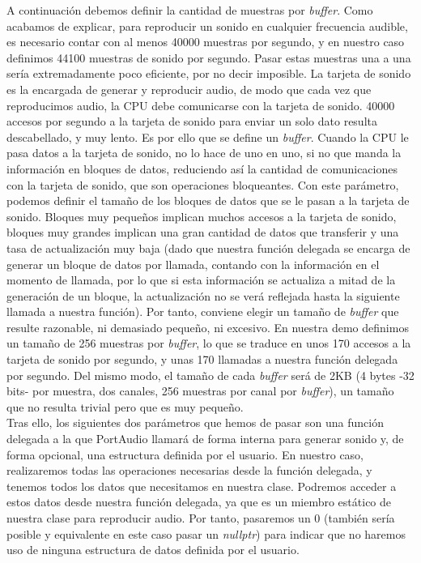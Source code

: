A continuación debemos definir la cantidad de muestras por \emph{buffer}. Como acabamos de explicar, para reproducir un sonido en cualquier frecuencia audible, es necesario contar con al menos 40000 muestras por segundo, y en nuestro caso definimos 44100 muestras de sonido por segundo. Pasar estas muestras una a una sería extremadamente poco eficiente, por no decir imposible. La tarjeta de sonido es la encargada de generar y reproducir audio, de modo que cada vez que reproducimos audio, la CPU debe comunicarse con la tarjeta de sonido. 40000 accesos por segundo a la tarjeta de sonido para enviar un solo dato resulta descabellado, y muy lento. Es por ello que se define un \emph{buffer}. Cuando la CPU le pasa datos a la tarjeta de sonido, no lo hace de uno en uno, si no que manda la información en bloques de datos, reduciendo así la cantidad de comunicaciones con la tarjeta de sonido, que son operaciones bloqueantes. Con este parámetro, podemos definir el tamaño de los bloques de datos que se le pasan a la tarjeta de sonido. Bloques muy pequeños implican muchos accesos a la tarjeta de sonido, bloques muy grandes implican una gran cantidad de datos que transferir y una tasa de actualización muy baja (dado que nuestra función delegada se encarga de generar un bloque de datos por llamada, contando con la información en el momento de llamada, por lo que si esta información se actualiza a mitad de la generación de un bloque, la actualización no se verá reflejada hasta la siguiente llamada a nuestra función). Por tanto, conviene elegir un tamaño de \emph{buffer} que resulte razonable, ni demasiado pequeño, ni excesivo. En nuestra demo definimos un tamaño de 256 muestras por \emph{buffer}, lo que se traduce en unos 170 accesos a la tarjeta de sonido por segundo, y unas 170 llamadas a nuestra función delegada por segundo. Del mismo modo, el tamaño de cada \emph{buffer} será de 2KB (4 bytes -32 bits- por muestra, dos canales, 256 muestras por  canal por \emph{buffer}), un tamaño que no resulta trivial pero que es muy pequeño.\\

Tras ello, los siguientes dos parámetros que hemos de pasar son una función delegada a la que PortAudio llamará de forma interna para generar sonido y, de forma opcional, una estructura definida por el usuario. En nuestro caso, realizaremos todas las operaciones necesarias desde la función delegada, y tenemos todos los datos que necesitamos en nuestra clase. Podremos acceder a estos datos desde nuestra función delegada, ya que es un miembro estático de nuestra clase para reproducir audio. Por tanto, pasaremos un 0 (también sería posible y equivalente en este caso pasar un \emph{nullptr}) para indicar que no haremos uso de ninguna estructura de datos definida por el usuario.\\

